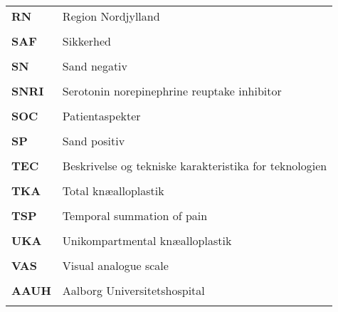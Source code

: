 \begin{longtable}{p{}  p{}}
\textbf{RN}  & Region Nordjylland                                             
\\ \\
\textbf{SAF} & Sikkerhed                                                
\\ \\
\textbf{SN}  & Sand negativ                                            
\\ \\
\textbf{SNRI}& Serotonin norepinephrine reuptake inhibitor              
\\ \\
\textbf{SOC} & Patientaspekter                             
\\ \\
\textbf{SP}  & Sand positiv                                          
\\ \\
\textbf{TEC} & Beskrivelse og tekniske karakteristika for teknologien   
\\ \\
\textbf{TKA} & Total knæalloplastik                                     
\\ \\
\textbf{TSP} & Temporal summation of pain                               
\\ \\
\textbf{UKA} & Unikompartmental knæalloplastik                          
\\ \\
\textbf{VAS} & Visual analogue scale
\\ \\
\textbf{AAUH}& Aalborg Universitetshospital                             
\\ \\
\end{longtable}
